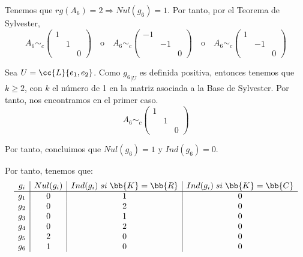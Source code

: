 \begin{ejercicio}
\begin{enumerate}
\begin{enumerate}
            Tenemos que $rg(A_6) = 2 \Longrightarrow Nul(g_6)=1$. Por tanto, por el Teorema de Sylvester,
            \begin{equation*}
                A_6 \sim_c \left(\begin{array}{ccc}
                    1 &  \\
                    & 1 \\
                    && 0 
                \end{array} \right)
                \quad \text{o} \quad
                A_6 \sim_c \left(\begin{array}{ccc}
                    -1 &  \\
                    & -1 \\
                    && 0 
                \end{array} \right)
                \quad \text{o} \quad
                A_6 \sim_c \left(\begin{array}{ccc}
                    1 &  \\
                    & -1 \\
                    && 0 
                \end{array} \right)
            \end{equation*}

            Sea $U=\cc{L}\{e_1, e_2\}$. Como ${g_6}_{\left|U\right.}$ es definida positiva, entonces tenemos que $k\geq 2$, con $k$ el número de 1 en la matriz asociada a la Base de Sylvester. Por tanto, nos encontramos en el primer caso.
            \begin{equation*}
                A_6 \sim_c \left(\begin{array}{ccc}
                    1 &  \\
                    & 1 \\
                    && 0 
                \end{array} \right)
            \end{equation*}
            
            Por tanto, concluimos que $Nul(g_6)=1$ y $Ind(g_6)=0$.
            
        \end{enumerate}
        Por tanto, tenemos que:
        \begin{equation}
            \begin{array}{c|c|c|c}
                g_i & Nul(g_i) & Ind(g_i) \;si\;\bb{K}=\bb{R} & Ind(g_i) \;si\;\bb{K}=\bb{C}\\ \hline
                g_1 & 0 & 1 & 0 \\
                g_2 & 0 & 2 & 0\\
                g_3 & 0 & 1 & 0\\
                g_4 & 0 & 2 & 0\\
                g_5 & 2 & 0 & 0\\
                g_6 & 1 & 0 & 0\\
            \end{array}
        \end{equation}


\end{enumerate}
\end{ejercicio}
